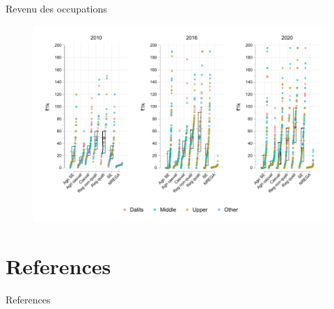 \documentclass[aspectratio=169]{beamer}
\begin{document}
\begin{frame}[plain, shrink=2]{Revenu des occupations}
\begin{figure}[htpb]
\centering
\includegraphics[scale=0.9]{INPUT/inc_occ_panel.pdf}
\end{figure}
\end{frame}







\section*{References}
\begin{frame}{References}


\end{frame}
\end{document}
